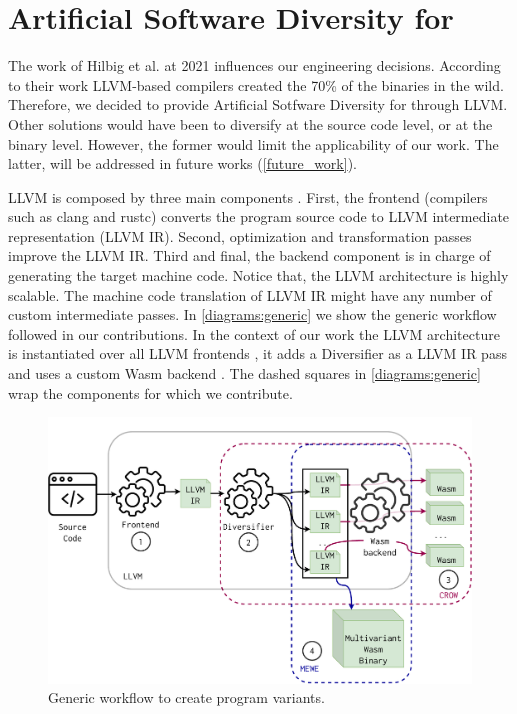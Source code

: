 \section{Artificial Software Diversity for \wasm}
\label{tech:generic}

The work of Hilbig et al. \cite{Hilbig2021AnES} at 2021 influences our engineering decisions. According to their work LLVM-based compilers created the 70\% of the \wasm binaries in the wild. Therefore, we decided to provide Artificial Sotfware Diversity for \wasm through LLVM. 
Other solutions would have been to diversify at the source code level, or at the \wasm binary level. However, the former would limit the applicability of our work. The latter, will be addressed in future works (\autoref{future_work}).

LLVM is composed by three main components \citationneeded. First, the frontend (compilers such as clang and rustc) converts the program source code to LLVM intermediate representation (LLVM IR). Second, optimization and transformation passes improve the LLVM IR. Third and final, the backend component is in charge of generating the target machine code. Notice that, the LLVM architecture is highly scalable. The machine code translation of LLVM IR might have any number of custom intermediate passes. In \autoref{diagrams:generic} we show the generic workflow followed in our contributions. 
In the context of our work the LLVM architecture is instantiated over all LLVM frontends , it adds a Diversifier as a LLVM IR pass  and uses a custom Wasm  backend .
The dashed squares in \autoref{diagrams:generic} wrap the components for which we contribute.

\begin{figure}[h]
    \includegraphics[width=\linewidth]{diagrams/architecture.pdf}
    \caption{Generic workflow to create \wasm program variants.}
    \label{diagrams:generic}
\end{figure}


